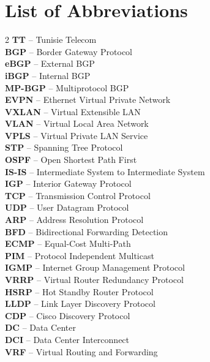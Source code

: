 \raggedright
\chapter*{List of Abbreviations}
\vspace{-0.2em}
\begin{multicols}{2}
\footnotesize
\setlength{\parindent}{2pt}
\setlength{\parskip}{5em}
\textbf{TT} -- Tunisie Telecom\\
\textbf{BGP} -- Border Gateway Protocol\\
\textbf{eBGP} -- External BGP\\
\textbf{iBGP} -- Internal BGP\\
\textbf{MP-BGP} -- Multiprotocol BGP\\
\textbf{EVPN} -- Ethernet Virtual Private Network\\
\textbf{VXLAN} -- Virtual Extensible LAN\\
\textbf{VLAN} -- Virtual Local Area Network\\
\textbf{VPLS} -- Virtual Private LAN Service\\
\textbf{STP} -- Spanning Tree Protocol\\
\textbf{OSPF} -- Open Shortest Path First\\
\textbf{IS-IS} -- Intermediate System to Intermediate System\\
\textbf{IGP} -- Interior Gateway Protocol\\
\textbf{TCP} -- Transmission Control Protocol\\
\textbf{UDP} -- User Datagram Protocol\\
\textbf{ARP} -- Address Resolution Protocol\\
\textbf{BFD} -- Bidirectional Forwarding Detection\\
\textbf{ECMP} -- Equal-Cost Multi-Path\\
\textbf{PIM} -- Protocol Independent Multicast\\
\textbf{IGMP} -- Internet Group Management Protocol\\
\textbf{VRRP} -- Virtual Router Redundancy Protocol\\
\textbf{HSRP} -- Hot Standby Router Protocol\\
\textbf{LLDP} -- Link Layer Discovery Protocol\\
\textbf{CDP} -- Cisco Discovery Protocol\\
\textbf{DC} -- Data Center\\
\textbf{DCI} -- Data Center Interconnect\\
\textbf{VRF} -- Virtual Routing and Forwarding\\

\end{multicols}
